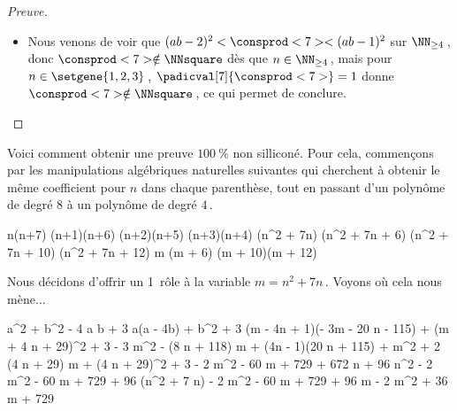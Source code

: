 \begin{proof}[Preuve]
	\begin{itemize}
		\item Nous venons de voir que $( a b - 2)^2 < \consprod<7> < ( a b - 1)^2$ sur $\NN_{\geq 4}$\,, donc $\consprod<7> \notin \NNsquare$ dès que $n \in \NN_{\geq 4}$\,, mais pour $n \in \setgene{1, 2, 3}$\,, $\padicval[7]{\consprod<7>} =1$ donne $\consprod<7> \notin \NNsquare$\,, ce qui permet de conclure.
	\end{itemize}
\end{proof}




\begin{remark}
	Voici comment obtenir une preuve $\qty{100}{\percent}$ non silliconé.
	Pour cela, commençons par les manipulations algébriques naturelles suivantes qui cherchent à obtenir le même coefficient pour $n$ dans chaque parenthèse, tout en passant d'un polynôme de degré $8$ à un polynôme de degré $4$\,.
    
    \medskip
    
    \begin{stepcalc}[style = sar]
    \explnext{}
    	n(n+7) \cdot (n+1)(n+6) \cdot (n+2)(n+5) \cdot (n+3)(n+4)
    \explnext{}
    	(n^2 + 7n) \cdot (n^2 + 7n + 6) \cdot (n^2 + 7n + 10) \cdot (n^2 + 7n + 12)
    	m (m + 6) (m + 10)(m + 12)
    \end{stepcalc}
    
    \medskip
    Nous décidons d'offrir un 1\ier\ rôle à la variable $m = n^2 + 7n$\,. Voyons où cela nous mène...
    
	\medskip
	\begin{stepcalc}[style = ar*, ope={=}]
    	a^2 + b^2 - 4 a b + 3
    \explnext{}
    	a(a - 4b) + b^2 + 3
    	(m - 4n + 1)(- 3m - 20 n - 115) 
		+
		(m + 4 n + 29)^2
		+
		3
    \explnext{}
    	- 3 m^2 - (8 n + 118) m + (4n - 1)(20 n + 115)
		+
		m^2 + 2 (4 n + 29) m
		+
		(4 n + 29)^2
		+
		3
    \explnext{}
    	- 2 m^2
		- 60 m 
		+
		729 + 672 n + 96 n^2
    	- 2 m^2
		- 60 m 
		+ 729 + 96 (n^2 + 7 n)
    \explnext{}
    	- 2 m^2
		- 60 m 
		+ 729 + 96 m
    \explnext{}
    	- 2 m^2 + 36 m + 729
    \end{stepcalc}
\end{remark}

